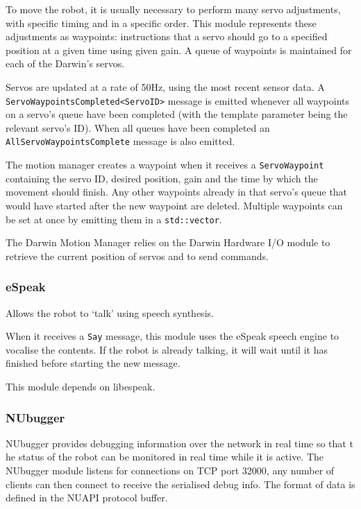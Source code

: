 \documentclass[english,12pt]{scrartcl}
\begin{document}
				To move the robot, it is usually necessary to perform many servo adjustments,
				with specific timing and in a specific order. This module represents these
				adjustments as waypoints: instructions that a servo should go to a specified
				position at a given time using given gain. A queue of waypoints is maintained
				for each of the Darwin's servos.
				
				Servos are updated at a rate of 50Hz, using the most recent sensor data. 
				A \texttt{ServoWaypointsCompleted<ServoID>} message is emitted whenever all waypoints on a servo's queue have been completed (with the template parameter being the relevant servo's ID). 
				When all queues have been completed an \texttt{AllServoWaypointsComplete} message is also emitted.
				
				The motion manager creates a waypoint when it receives a \texttt{ServoWaypoint}
				containing the servo ID, desired position, gain and the time by which the movement should finish. Any other waypoints already in that servo's queue that
				would have started after the new waypoint are deleted. Multiple waypoints can be
				set at once by emitting them in a \texttt{std::vector}.
				
				The Darwin Motion Manager relies on the Darwin Hardware I/O module to retrieve
				the current position of servos and to send commands.

			\subsubsection{eSpeak}
				Allows the robot to `talk' using speech synthesis.
				
				When it receives a \texttt{Say} message, this module uses the eSpeak speech engine
				to vocalise the contents. If the robot is already talking, it will wait until it
				has finished before starting the new message.
				
				This module depends on libespeak.
				
				
			\subsubsection{NUbugger}
				NUbugger provides debugging information over the network in real time so that t
				he status of the robot can be monitored in real time while it is active. The
				NUbugger module listens for connections on TCP port 32000, any number of
				clients can then connect to receive the serialised debug info. The format of
				data is defined in the NUAPI protocol buffer.
				
\end{document}
